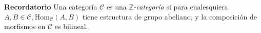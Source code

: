 \documentclass[preview]{standalone}
\begin{document}
\begin{center}
\justifying \textbf{Recordatorio} Una categoría $\mathscr{C}$ es una $\mathbb{Z}$-\emph{categoría} si para cualesquiera $A,B\in\mathscr{C}, \text{Hom}_\mathscr{C}(A,B)$ tiene estructura de grupo abeliano, y la composición de morfismos en $\mathscr{C}$ es bilineal.
\end{center}
\end{document}
